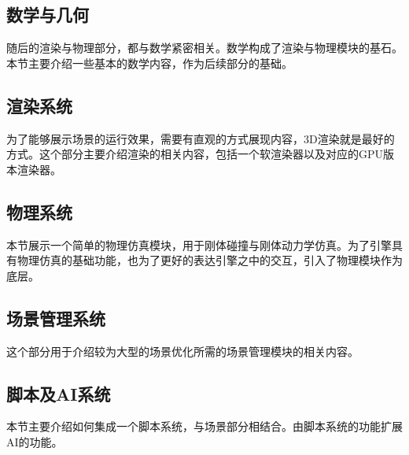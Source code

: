\maketitle
\subsection{数学与几何}

随后的渲染与物理部分，都与数学紧密相关。数学构成了渲染与物理模块的基石。本节主要介绍一些基本的数学内容，作为后续部分的基础。

\maketitle
\subsection{渲染系统}

为了能够展示场景的运行效果，需要有直观的方式展现内容，3D渲染就是最好的方式。这个部分主要介绍渲染的相关内容，包括一个软渲染器以及对应的GPU版本渲染器。

\maketitle
\subsection{物理系统}

本节展示一个简单的物理仿真模块，用于刚体碰撞与刚体动力学仿真。为了引擎具有物理仿真的基础功能，也为了更好的表达引擎之中的交互，引入了物理模块作为底层。

\maketitle
\subsection{场景管理系统}

这个部分用于介绍较为大型的场景优化所需的场景管理模块的相关内容。

\maketitle
\subsection{脚本及AI系统}

本节主要介绍如何集成一个脚本系统，与场景部分相结合。由脚本系统的功能扩展AI的功能。
